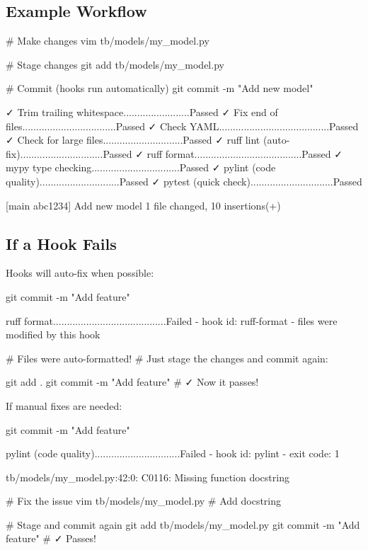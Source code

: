 \subsection{Example Workflow}\label{cr:app:archive-quickstart-precommit:example-workflow}

\begin{record}

\begin{textblock}
# Make changes
vim tb/models/my_model.py

# Stage changes
git add tb/models/my_model.py

# Commit (hooks run automatically)
git commit -m "Add new model"

✓ Trim trailing whitespace........................Passed
✓ Fix end of files..................................Passed
✓ Check YAML........................................Passed
✓ Check for large files.............................Passed
✓ ruff lint (auto-fix)..............................Passed
✓ ruff format.......................................Passed
✓ mypy type checking................................Passed
✓ pylint (code quality).............................Passed
✓ pytest (quick check)..............................Passed

[main abc1234] Add new model
 1 file changed, 10 insertions(+)
\end{textblock}

\end{record}

\subsection{If a Hook Fails}\label{cr:app:archive-quickstart-precommit:if-a-hook-fails}

\begin{record}

Hooks will auto-fix when possible:

\begin{textblock}
git commit -m "Add feature"

ruff format.........................................Failed
- hook id: ruff-format
- files were modified by this hook

# Files were auto-formatted!
# Just stage the changes and commit again:

git add .
git commit -m "Add feature"
# ✓ Now it passes!
\end{textblock}

If manual fixes are needed:

\begin{textblock}
git commit -m "Add feature"

pylint (code quality)...............................Failed
- hook id: pylint
- exit code: 1

tb/models/my_model.py:42:0: C0116: Missing function docstring

# Fix the issue
vim tb/models/my_model.py  # Add docstring

# Stage and commit again
git add tb/models/my_model.py
git commit -m "Add feature"
# ✓ Passes!
\end{textblock}

\end{record}


